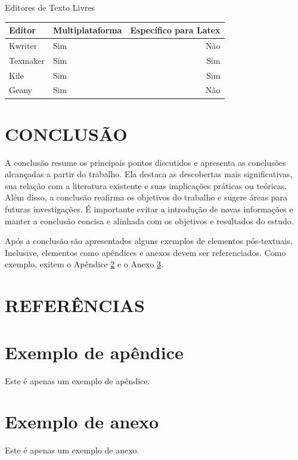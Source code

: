 \documentclass[estagio]{iftex2024}
\begin{document}
\begin{board}[!htb] \centering
\caption{Editores de Texto Livres} \label{quadro:editores_texto_livres}
\begin{varwidth}{\linewidth}
\begin{tabular}{|l|l|r|}        \hline
Editor     & Multiplataforma & Específico para Latex \\ \hline
Kwriter    & Sim             & Não                   \\
Texmaker   & Sim             & Sim                   \\
Kile       & Sim             & Sim                   \\
Geany      & Sim             & Não                   \\ \hline
\end{tabular}
\end{varwidth}
\end{board}

\chapter{CONCLUSÃO}

A conclusão resume os principais pontos discutidos e apresenta as conclusões alcançadas a partir do trabalho.
Ela destaca as descobertas mais significativas, sua relação com a literatura existente e suas implicações práticas ou teóricas.
Além disso, a conclusão reafirma os objetivos do trabalho e sugere áreas para futuras investigações.
É importante evitar a introdução de novas informações e manter a conclusão concisa e alinhada com os objetivos e resultados do estudo.

Após a conclusão são apresentados alguns exemplos de elementos pós-textuais.
Inclusive, elementos como apêndices e anexos devem ser referenciados.
Como exemplo, exitem o Apêndice \ref{ap:exemplo} e o Anexo \ref{an:exemplo}.

\chapter*{REFERÊNCIAS}

\printbibliography

\appendix

\chapter{Exemplo de apêndice} \label{ap:exemplo}

Este é apenas um exemplo de apêndice.

\attachment

\chapter{Exemplo de anexo} \label{an:exemplo}

Este é apenas um exemplo de anexo.
\end{document}

